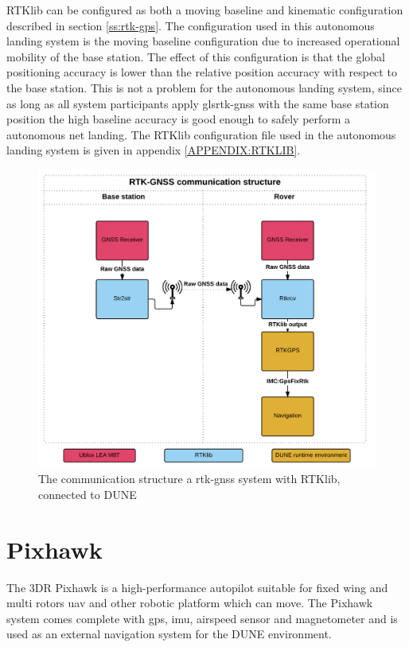 RTKlib can be configured as both a moving baseline and kinematic configuration described in section \ref{ss:rtk-gps}. The configuration used in this autonomous landing system is the moving baseline configuration due to increased operational mobility of the base station. The effect of this configuration is that the global positioning accuracy is lower than the relative position accuracy with respect to the base station. This is not a problem for the autonomous landing system, since as long as all system participants apply gls{rtk-gnss} with the same base station position the high baseline accuracy is good enough to safely perform a autonomous net landing. The RTKlib configuration file used in the autonomous landing system is given in appendix \ref{APPENDIX:RTKLIB}.
\begin{figure}[h]
	\centering
		\includegraphics[scale=0.7]{figs/RTKGNSS.png}
		\caption{The communication structure a \gls{rtk-gnss} system with RTKlib, connected to DUNE}
		\label{figure:RTKLIB_STRUCTURE}
\end{figure}
\newpage

\section{Pixhawk}\label{ss:Pixhawk}
The 3DR Pixhawk is a high-performance autopilot suitable for fixed wing and multi rotors \gls{uav} and other robotic platform which can move. The Pixhawk system comes complete with \gls{gps}, imu, airspeed sensor and magnetometer and is used as an external navigation system for the DUNE environment.
